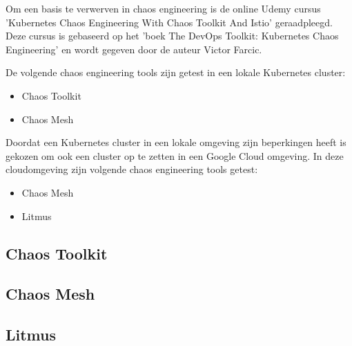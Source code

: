 Om een basis te verwerven in chaos engineering is de online Udemy cursus 'Kubernetes Chaos Engineering With Chaos Toolkit And Istio' geraadpleegd. Deze cursus is gebaseerd op het 'boek The DevOps Toolkit: Kubernetes Chaos Engineering' en wordt gegeven door de auteur Victor Farcic.  \autocite{Farcic2020}

De volgende chaos engineering tools zijn getest in een lokale Kubernetes cluster:

\begin{itemize}
    \item Chaos Toolkit
    \item Chaos Mesh 
\end{itemize}

Doordat een Kubernetes cluster in een lokale omgeving zijn beperkingen heeft is gekozen om ook een cluster op te zetten in een Google Cloud omgeving. In deze cloudomgeving zijn volgende chaos engineering tools getest: 

\begin{itemize}
    \item Chaos Mesh
    \item Litmus 
\end{itemize}






\subsection{Chaos Toolkit}

\subsection{Chaos Mesh}

\subsection{Litmus}